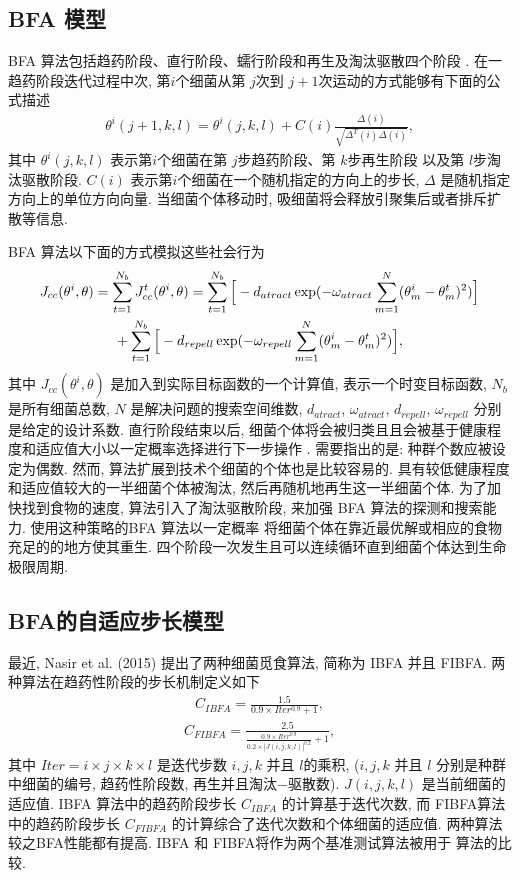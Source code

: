 \subsection{BFA 模型}\label{TPMsec1}
    BFA 算法包括趋药阶段、直行阶段、蠕行阶段和再生及淘汰驱散四个阶段 .
    在一趋药阶段迭代过程中次, 第$i$个细菌从第 $j$次到  $j+1$次运动的方式能够有下面的公式描述
\begin{align}\label{AdapchemCI}
    \theta^{i}(j+1,k,l)=\theta^{i}(j,k,l)+C(i)\frac{\Delta(i)}{\sqrt{\Delta^{T}(i)\Delta(i)}},
\end{align}
其中 $\theta^{i}(j,k,l)$ 表示第$i$个细菌在第 $j$步趋药阶段、第 $k$步再生阶段 以及第 $l$步淘汰驱散阶段.
$C(i)$ 表示第$i$个细菌在一个随机指定的方向上的步长, $\Delta$ 是随机指定方向上的单位方向向量. 当细菌个体移动时, 吸细菌将会释放引聚集后或者排斥扩散等信息.

BFA 算法以下面的方式模拟这些社会行为
\begin{align}
    J_{cc}&(\theta^{i}, \theta)=\sum_{t=1}^{N_b}J_{cc}^{t}(\theta^{i},\theta)
            = \sum_{t=1}^{N_b}\Big[-d_{atract}\exp(-\omega_{atract}\sum_{m=1}^{N}(\theta_{m}^{i}-\theta_{m}^{t})^2)\Big]\notag \\
&\qquad\qquad+\sum_{t=1}^{N_b}\Big[-d_{repell}\exp(-\omega_{repell}\sum_{m=1}^{N}(\theta_{m}^{i}-\theta_{m}^{t})^2)\Big],
\end{align}
其中 $J_{cc}(\theta^i,\theta)$ 是加入到实际目标函数的一个计算值, 表示一个时变目标函数, $N_b$ 是所有细菌总数, $N$ 是解决问题的搜索空间维数, $d_{atract}$, $\omega_{atract}$, $d_{repell}$, $\omega_{repell}$ 分别是给定的设计系数.
直行阶段结束以后, 细菌个体将会被归类且且会被基于健康程度和适应值大小以一定概率选择进行下一步操作 .
需要指出的是: 种群个数应被设定为偶数. 然而, 算法扩展到技术个细菌的个体也是比较容易的.
具有较低健康程度和适应值较大的一半细菌个体被淘汰, 然后再随机地再生这一半细菌个体.
为了加快找到食物的速度, 算法引入了淘汰驱散阶段, 来加强 BFA 算法的探测和搜索能力.
使用这种策略的BFA 算法以一定概率 将细菌个体在靠近最优解或相应的食物充足的的地方使其重生.
四个阶段一次发生且可以连续循环直到细菌个体达到生命极限周期.
\subsection{BFA的自适应步长模型}
最近, Nasir et al. (2015) 提出了两种细菌觅食算法, 简称为 IBFA 并且 FIBFA. 两种算法在趋药性阶段的步长机制定义如下
\begin{align}\label{AdapchemCIBFA}
    C_{IBFA}=\frac {1.5} {0.9\times Iter^{0.9}+1},
\end{align}
\begin{align}\label{AdapchemCF}
     C_{FIBFA}= \frac {2.5} {\frac{0.9\times Iter^{0.9}}{0.2\times|J(i,j,k,l)|^{0.2}}+1},
\end{align}
其中 $Iter=i\times j\times k\times l$ 是迭代步数 $i, j, k$ 并且 $l$的乘积, ($i, j, k$ 并且 $l$ 分别是种群中细菌的编号, 趋药性阶段数, 再生并且淘汰$-$驱散数). $J(i, j, k, l)$ 是当前细菌的适应值.
IBFA 算法中的趋药阶段步长 $C_{IBFA}$ 的计算基于迭代次数, 而 FIBFA算法中的趋药阶段步长 $C_{FIBFA}$ 的计算综合了迭代次数和个体细菌的适应值.
两种算法较之BFA性能都有提高. IBFA 和 FIBFA将作为两个基准测试算法被用于 算法的比较.
